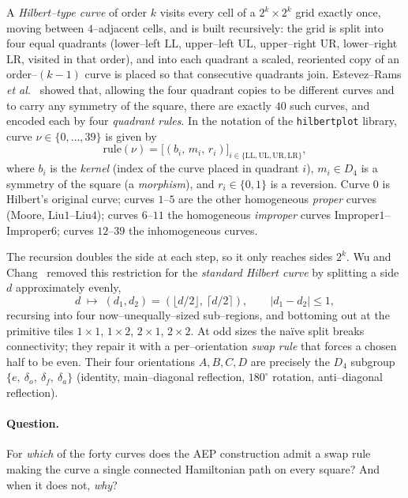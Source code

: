 \documentclass[11pt]{article}
\theoremstyle{definition}
\newcommand{\LL}{\mathrm{LL}}
\newcommand{\UL}{\mathrm{UL}}
\newcommand{\UR}{\mathrm{UR}}
\newcommand{\LR}{\mathrm{LR}}
\newcommand{\Dfour}{D_4}
\begin{document}
A \emph{Hilbert--type curve} of order $k$ visits every cell of a $2^k\times 2^k$ grid
exactly once, moving between $4$--adjacent cells, and is built recursively: the grid is
split into four equal quadrants (lower--left $\LL$, upper--left $\UL$, upper--right $\UR$,
lower--right $\LR$, visited in that order), and into each quadrant a scaled, reoriented
copy of an order--$(k-1)$ curve is placed so that consecutive quadrants join. Estevez--Rams
\emph{et al.}~\cite{estevez2017} showed that, allowing the four quadrant copies to be
different curves and to carry any symmetry of the square, there are exactly $40$ such
curves, and encoded each by four \emph{quadrant rules}. In the notation of the
\texttt{hilbertplot} library, curve $\nu\in\{0,\dots,39\}$ is given by
\[
   \mathrm{rule}(\nu)=\big[(b_i,\,m_i,\,r_i)\big]_{i\in\{\LL,\UL,\UR,\LR\}},
\]
where $b_i$ is the \emph{kernel} (index of the curve placed in quadrant $i$), $m_i\in \Dfour$
is a symmetry of the square (a \emph{morphism}), and $r_i\in\{0,1\}$ is a reversion. Curve
$0$ is Hilbert's original curve; curves $1$--$5$ are the other homogeneous \emph{proper}
curves (Moore, Liu$1$--Liu$4$); curves $6$--$11$ the homogeneous \emph{improper} curves
Improper$1$--Improper$6$; curves $12$--$39$ the inhomogeneous curves.

The recursion doubles the side at each step, so it only reaches sides $2^k$. Wu and
Chang~\cite{wuchang2012} removed this restriction for the \emph{standard Hilbert curve}
by splitting a side $d$ approximately evenly,
\[
   d \;\longmapsto\; (d_1,d_2)=(\lfloor d/2\rfloor,\ \lceil d/2\rceil),\qquad |d_1-d_2|\le 1,
\]
recursing into four now--unequally--sized sub--regions, and bottoming out at the primitive
tiles $1\times1$, $1\times2$, $2\times1$, $2\times2$. At odd sizes the na\"ive split breaks
connectivity; they repair it with a per--orientation \emph{swap rule} that forces a chosen
half to be even. Their four orientations $A,B,C,D$ are precisely the $\Dfour$ subgroup
$\{e,\ \delta_o,\ \delta_f,\ \delta_a\}$ (identity, main--diagonal reflection, $180^\circ$
rotation, anti--diagonal reflection).

\paragraph{Question.} For \emph{which} of the forty curves does the AEP construction admit
a swap rule making the curve a single connected Hamiltonian path on every square? And when
it does not, \emph{why}?
\end{document}
